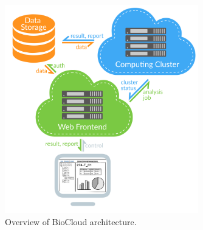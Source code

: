 \begin{figure}[!htb]
\centering
\includegraphics[width=0.75\textwidth]{images/overview_arch}
\caption[BioCloud overview architecture]{Overview of BioCloud architecture.}
\label{fig:overview-arch}
\end{figure}

